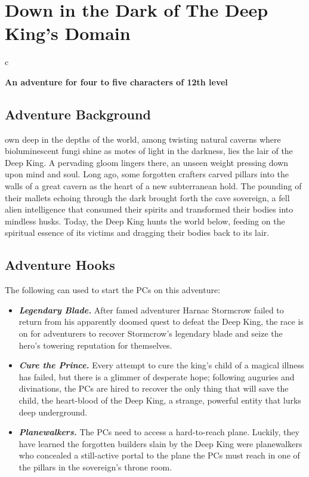 \documentclass[10pt,a4paper,twoside,bg=print,twocolumn,openany,nodeprecatedcode]{dndbook}
\begin{document}
\chapter{Down in the Dark of The Deep King's Domain}

\begin{DndTable}{c}

\textbf{An adventure for four to five characters of 12th level}\\
\end{DndTable}

\section{Adventure Background}
own deep in the depths of the world, among twisting natural caverns where bioluminescent fungi shine as motes of light in the darkness, lies the lair of the Deep King. A pervading gloom lingers there, an unseen weight pressing down upon mind and soul. Long ago, some forgotten crafters carved pillars into the walls of a great cavern as the heart of a new subterranean hold. The pounding of their mallets echoing through the dark brought forth the cave sovereign, a fell alien intelligence that consumed their spirits and transformed their bodies into mindless husks. Today, the Deep King hunts the world below, feeding on the spiritual essence of its victims and dragging their bodies back to its lair.


\section{Adventure Hooks}
The following can used to start the PCs on this adventure:


\begin{itemize}
\item \textbf{\textit{Legendary Blade.}} After famed adventurer Harnac Stormcrow failed to return from his apparently doomed quest to defeat the Deep King, the race is on for adventurers to recover Stormcrow's legendary blade and seize the hero's towering reputation for themselves.
\item \textbf{\textit{Cure the Prince.}} Every attempt to cure the king's child of a magical illness has failed, but there is a glimmer of desperate hope; following auguries and divinations, the PCs are hired to recover the only thing that will save the child, the heart-blood of the Deep King, a strange, powerful entity that lurks deep underground.
\item \textbf{\textit{Planewalkers.}} The PCs need to access a hard-to-reach plane. Luckily, they have learned the forgotten builders slain by the Deep King were planewalkers who concealed a still-active portal to the plane the PCs must reach in one of the pillars in the sovereign's throne room.
\end{itemize}
\end{document}
